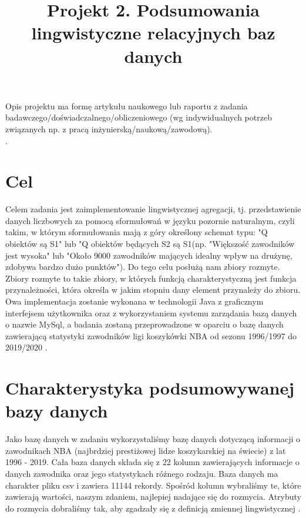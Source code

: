 \documentclass{classrep}
\author{
  \studentinfo{Hubert Gawłowski}{224298} \and
  \studentinfo{Kamil Kiszko-Zgierski}{224328} }
\title{Projekt 2.  Podsumowania lingwistyczne relacyjnych baz danych}
\begin{document}
\maketitle

Opis projektu ma formę artykułu naukowego lub raportu z zadania
badawczego/doświadczalnego/obliczeniowego (wg indywidualnych potrzeb związanych np. z
pracą inżynierską/naukową/zawodową). \\
. 

\section{Cel}
Celem zadania jest zaimplementowanie lingwistycznej agregacji, tj. przedstawienie danych liczbowych za pomocą sformułowań w języku pozornie naturalnym, czyli takim, w którym sformułowania mają z góry określony schemat typu: "Q obiektów są S1" lub "Q obiektów będących S2 są S1\cite{niewiadomski08}(np. "Większość zawodników jest wysoka" lub "Około 9000 zawodników mających idealny wpływ na drużynę, zdobywa bardzo dużo punktów"). Do tego celu posłużą nam zbiory rozmyte. Zbiory rozmyte to takie zbiory, w których funkcją charakterystyczną jest funkcja przynależności, która określa w jakim stopniu dany element przynależy do zbioru. Owa implementacja zostanie wykonana w technologii Java z graficznym interfejsem użytkownika oraz z wykorzystaniem systemu zarządania bazą danych o nazwie MySql, a badania zostaną przeprowadzone w oparciu o bazę danych zawierającą statystyki zawodników ligi koszykówki NBA od sezonu 1996/1997 do 2019/2020 \cite{nba_data}.  \\


\section{Charakterystyka podsumowywanej bazy danych}

Jako bazę danych w zadaniu wykorzystaliśmy bazę danych dotyczącą informacji o zawodnikach NBA (najbrdziej prestiżowej lidze koszykarskiej na świecie) z lat 1996 - 2019. Cała baza danych składa się z 22 kolumn zawierających informacje o danych zawodnika oraz jego statystykach różnego rodzaju. Baza danych ma charakter pliku csv i zawiera 11144 rekordy. Spośród kolumn wybraliśmy te, które zawierają wartości, naszym zdaniem, najlepiej nadające się do rozmycia. Atrybuty do rozmycia dobraliśmy tak, aby zgadzały się z definicją zmiennej lingwistycznej \cite{niewiadomski19}. \\
\end{document}
